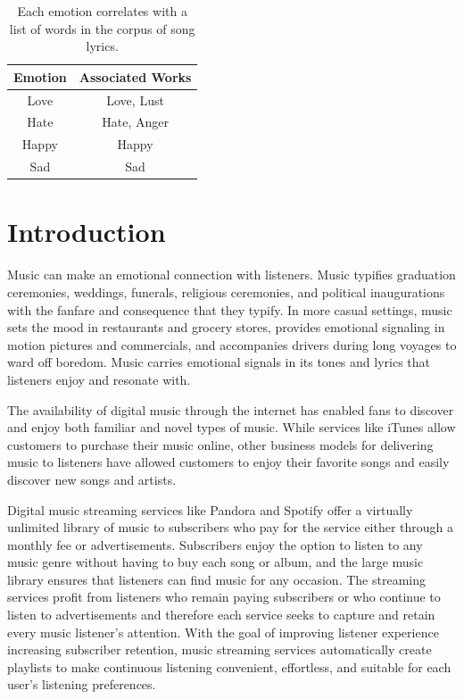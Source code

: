\documentclass[10pt,twocolumn]{article}
\begin{document}
\begin{table}
\begin{center}
 \begin{tabular}{ | c | c | } 
 \hline
\textbf{Emotion} & \textbf{Associated Works} \\ [0.5ex] 
 \hline
Love & Love, Lust \\ 
 \hline
Hate & Hate, Anger \\ 
 \hline
Happy & Happy \\ 
 \hline
Sad & Sad \\ 
 \hline
\end{tabular}
\caption{Each emotion correlates with a list of words in the corpus of song lyrics.}
\end{center}
\end{table}

\section{Introduction}
Music can make an emotional connection with listeners.  Music typifies graduation ceremonies, weddings, funerals, religious ceremonies, and political inaugurations with the fanfare and consequence that they typify.  In more casual settings, music sets the mood in restaurants and grocery stores, provides emotional signaling in motion pictures and commercials, and accompanies drivers during long voyages to ward off boredom.  Music carries emotional signals in its tones and lyrics that listeners enjoy and resonate with.

The availability of digital music through the internet has enabled fans to discover and enjoy both familiar and novel types of music.  While services like iTunes \cite{a16} allow customers to purchase their music online, other business models for delivering music to listeners have allowed customers to enjoy their favorite songs and easily discover new songs and artists.

Digital music streaming services like Pandora \cite{a12} and Spotify \cite{a13} offer a virtually unlimited library of music to subscribers who pay for the service either through a monthly fee or advertisements.  Subscribers enjoy the option to listen to any music genre without having to buy each song or album, and the large music library ensures that listeners can find music for any occasion.  The streaming services profit from listeners who remain paying subscribers or who continue to listen to advertisements and therefore each service seeks to capture and retain every music listener's attention.  With the goal of improving listener experience increasing subscriber retention, music streaming services automatically create playlists to make continuous listening convenient, effortless, and suitable for each user's listening preferences.
\end{document}
